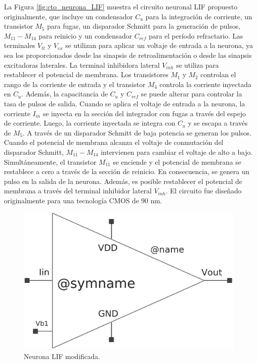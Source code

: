 \documentclass[conference]{IEEEtran}
\begin{document}
La Figura \ref{fig:cto_neurona_LIF} muestra el circuito neuronal LIF propuesto originalmente, que incluye un condensador $C_{u}$ para la integración de corriente, un transistor $M_5$ para fugas, un disparador Schmitt para la generación de pulsos, $M_{11}-M_{14}$ para reinicio y un condensador $C_{ref}$ para el período refractario. Las terminales $V_{tt}$ y $V_{ex}$ se utilizan para aplicar un voltaje de entrada a la neurona, ya sea los proporcionados desde las sinapsis de retroalimentación o desde las sinapsis excitadoras laterales. La terminal inhibidora lateral $V_{inh}$ se utiliza para restablecer el potencial de membrana. Los transistores $M_{1}$ y $M_{2}$ controlan el rango de la corriente de entrada y el transistor $M_{4}$ controla la corriente inyectada en $C_{u}$. Además, la capacitancia de $C_{u}$ y $C_{ref}$ se puede alterar para controlar la tasa de pulsos de salida. Cuando se aplica el voltaje de entrada a la neurona, la corriente $I_{in}$ se inyecta en la sección del integrador con fugas a través del espejo de corriente. Luego, la corriente inyectada se integra con $C_{u}$ y se escapa a través de $M_{5}$. A través de un disparador Schmitt de baja potencia se generan los pulsos. Cuando el potencial de membrana alcanza el voltaje de conmutación del disparador Schmitt, $M_{11}-M_{14}$ intervienen para cambiar el voltaje de alto a bajo. Simultáneamente, el transistor $M_{11}$ se enciende y el potencial de membrana se restablece a cero a través de la sección de reinicio. En consecuencia, se genera un pulso en la salida de la neurona. Además, es posible restablecer el potencial de membrana a través del terminal inhibidor lateral $V_{inh}$. El circuito fue diseñado originalmente para una tecnología CMOS de 90 nm.

\begin{figure}[ht]
	\centering
	\includegraphics[scale=0.17]{img/cto_neurona_LIF_cc.png}
	\caption{Neurona LIF modificada.
		\label{fig:cto_neurona_LIF_cc}}
\end{figure}
\end{document}

